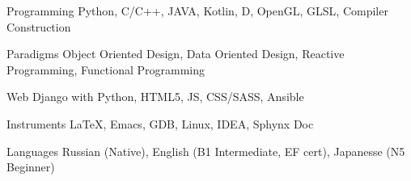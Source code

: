 


\begin{cvskills}


\cvskill
{Programming} %
{Python, C/C++, JAVA, Kotlin, D, OpenGL, GLSL, Compiler Construction} %

\cvskill
{Paradigms} %
{Object Oriented Design, Data Oriented Design, Reactive Programming, Functional Programming}



\cvskill
{Web} %
{Django with Python, HTML5, JS, CSS/SASS, Ansible} %

\cvskill
{Instruments}
{LaTeX, Emacs, GDB, Linux, IDEA, Sphynx Doc}


\cvskill
{Languages} %
{Russian (Native), English (B1 Intermediate, EF cert), Japanesse (N5 Beginner)} %


\end{cvskills}
